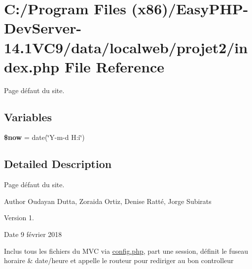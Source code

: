 \hypertarget{index_8php}{}\section{C\+:/\+Program Files (x86)/\+Easy\+P\+H\+P-\/\+Dev\+Server-\/14.1\+V\+C9/data/localweb/projet2/index.php File Reference}
\label{index_8php}


Page défaut du site.  


\subsection*{Variables}
\begin{DoxyCompactItemize}
\item 
\mbox{\label{index_8php_af1d5ccdee975b8f4d20aaffc5b28557c}} 
{\bfseries \$now} = date(\char`\"{}Y-\/m-\/d H\+:i\char`\"{})
\end{DoxyCompactItemize}


\subsection{Detailed Description}
Page défaut du site. 

\begin{DoxyAuthor}{Author}
Oudayan Dutta, Zoraida Ortiz, Denise Ratté, Jorge Subirats 
\end{DoxyAuthor}
\begin{DoxyVersion}{Version}
1. 
\end{DoxyVersion}
\begin{DoxyDate}{Date}
9 février 2018
\end{DoxyDate}
Inclus tous les fichiers du M\+VC via \hyperlink{config_8php}{config.\+php}, part une session, définit le fuseau horaire \& date/heure et appelle le routeur pour rediriger au bon controlleur 